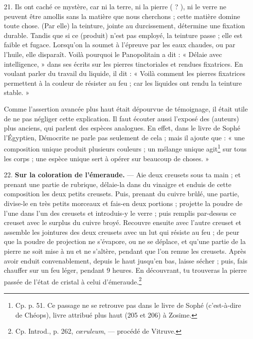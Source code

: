 \documentclass[a4paper, 11pt, oneside, polutonikogreek, french]{article}
\begin{document}
21. Ils ont caché ce mystère, car ni la terre, ni la pierre ( ? ), ni le verre ne peuvent être amollis sans la matière que nous cherchons ; cette matière domine toute chose. (Par elle) la teinture, jointe au durcissement, détermine une fixation durable. Tandis que si ce (produit) n'est pas employé, la teinture passe ; elle est faible et fugace. Lorsqu'on la soumet à l'épreuve par les eaux chaudes, ou par l'huile, elle disparaît. Voilà pourquoi le Panopolitain a dit : « Délaie avec intelligence, » dans ses écrits sur les pierres tinctoriales et rendues fixatrices. En voulant parler du travail du liquide, il dit : « Voilà comment les pierres fixatrices permettent à la couleur de résister au feu ; car les liquides ont rendu la teinture stable. »

Comme l'assertion avancée plus haut était dépourvue de témoignage, il était utile de ne pas négliger cette explication. Il faut écouter aussi l'exposé des (auteurs) plus anciens, qui parlent des espèces analogues. En effet, dans le livre de Sophé l'Égyptien, Démocrite ne parle pas seulement de cela ; mais il ajoute que : « une composition unique produit plusieurs couleurs ; un mélange unique agit\footnote{Cp. p. 51. Ce passage ne se retrouve pas dans le livre de Sophé (c'est-à-dire de Chéops), livre attribué plus haut (205 et 206) à Zosime.} sur tous les corps ; une espèce unique sert à opérer sur beaucoup de choses. »

22. \textbf{Sur la coloration de l'émeraude.} --- Aie deux creusets sous ta main ; et prenant une partie de rubrique, délaie-la dans du vinaigre et enduis de cette composition les deux petits creusets. Puis, prenant du cuivre brûlé, une partie, divise-le en très petits morceaux et fais-en deux portions ; projette la poudre de l'une dans l'un des creusets et introduis-y le verre ; puis remplis par-dessus ce creuset avec le surplus du cuivre broyé. Recouvre ensuite avec l'autre creuset et assemble les jointures des deux creusets avec un lut qui résiste au feu ; de peur que la poudre de projection ne s'évapore, ou ne se déplace, et qu'une partie de la pierre ne soit mise à nu et ne s'altère, pendant que l'on remue les creusets. Après avoir enduit convenablement, depuis le haut jusqu'en bas, laisse sécher ; puis, fais chauffer sur un feu léger, pendant 9 heures. En découvrant, tu trouveras la pierre passée de l'état de cristal à celui d'émeraude.\footnote{Cp. Introd., p. 262, \emph{cœruleum}, --- procédé de Vitruve.}
\end{document}
